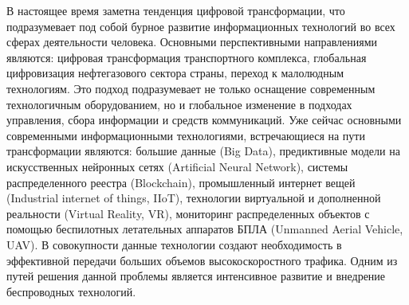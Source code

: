 {\actuality} 

В настоящее время заметна тенденция цифровой трансформации, что подразумевает под собой бурное развитие информационных технологий во всех сферах деятельности человека. Основными перспективными направлениями являются: цифровая трансформация транспортного комплекса, глобальная цифровизация нефтегазового сектора страны, переход к малолюдным технологиям. Это подход подразумевает не только оснащение современным технологичным оборудованием, но и глобальное изменение в подходах управления, сбора информации и средств коммуникаций. Уже сейчас основными современными информационными технологиями, встречающиеся на пути трансформации являются: большие данные (Big Data), предиктивные модели на искусственных нейронных сетях (Artificial Neural Network), системы распределенного реестра (Blockchain), промышленный интернет вещей (Industrial internet of things, IIoT), технологии виртуальной и дополненной реальности (Virtual Reality, VR), мониторинг распределенных объектов с помощью беспилотных летательных аппаратов БПЛА (Unmanned Aerial Vehicle, UAV). В совокупности данные технологии создают необходимость в эффективной передачи больших объемов высокоскоростного трафика. Одним из путей решения данной проблемы является интенсивное развитие и внедрение беспроводных технологий.


 
